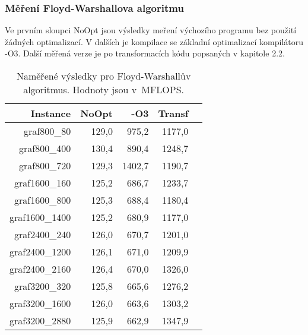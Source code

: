 \documentclass[a4paper,11pt]{article}
\begin{document}
\subsubsection{Měření Floyd-Warshallova algoritmu}
Ve prvním sloupci NoOpt jsou výsledky meření výchozího programu bez použití žádných optimalizací. V dalších je kompilace se základní optimalizací kompilátoru -O3. Další měřená verze je po transformacích kódu popsaných v kapitole 2.2.
\begin{table}[H]
  \begin{center}
      \begin{tabular}{|r|r|r|r|r|}
      \hline
      Instance  	& NoOpt	    & -O3     & Transf	   \\ \hline
      graf800\_80  	& 129,0     & 975,2   & 1177,0     \\ \hline
      graf800\_400     	& 130,4     & 890,4   & 1248,7     \\ \hline
      graf800\_720  	& 129,3     & 1402,7  & 1190,7     \\ \hline
      graf1600\_160    	& 125,2     & 686,7   & 1233,7     \\ \hline
      graf1600\_800  	& 125,3     & 688,4   & 1180,4 	    \\ \hline
      graf1600\_1400   	& 125,2     & 680,9   & 1177,0 	    \\ \hline
      graf2400\_240  	& 126,0     & 670,7   & 1201,0           \\ \hline
      graf2400\_1200   	& 126,1     & 671,0   & 1209,9           \\ \hline
      graf2400\_2160  	& 126,4     & 670,0   & 1326,0           \\ \hline
      graf3200\_320    	& 125,8     & 665,6   & 1276,2           \\ \hline
      graf3200\_1600  	& 126,0     & 663,6   & 1303,2           \\ \hline
      graf3200\_2880   	& 125,9     & 662,9   & 1347,9           \\ \hline
      \end{tabular}
  \caption{Naměřené výsledky pro Floyd-Warshallův algoritmus. Hodnoty jsou v~MFLOPS.}
  \label{tab:fw1}
  \end{center}
\end{table}



\end{document}
